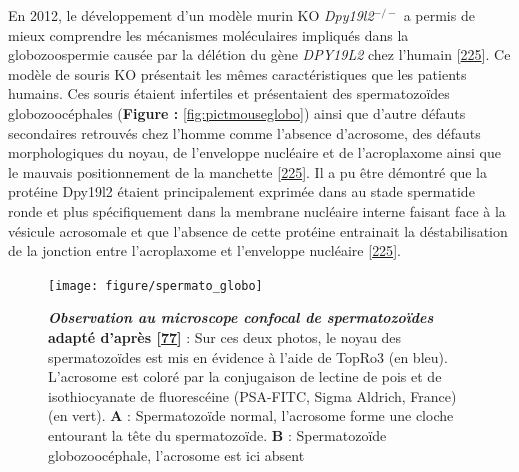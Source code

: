 \documentclass[12pt,a4paper,twoside]{ugathesis}
\theoremstyle{definition}
\theoremstyle{definition}
\theoremstyle{definition}
\theoremstyle{remark}
\begin{document}
En 2012, le développement d'un modèle murin KO \emph{Dpy19l2}\(^{-/-}\)
a permis de mieux comprendre les mécanismes moléculaires impliqués dans
la globozoospermie causée par la délétion du gène \emph{DPY19L2} chez
l'humain {[}\protect\hyperlink{ref-Pierre2012}{225}{]}. Ce modèle de
souris KO présentait les mêmes caractéristiques que les patients
humains. Ces souris étaient infertiles et présentaient des
spermatozoïdes globozoocéphales (\textbf{Figure :
}\ref{fig:pictmouseglobo}) ainsi que d'autre défauts secondaires
retrouvés chez l'homme comme l'absence d'acrosome, des défauts
morphologiques du noyau, de l'enveloppe nucléaire et de l'acroplaxome
ainsi que le mauvais positionnement de la manchette
{[}\protect\hyperlink{ref-Pierre2012}{225}{]}. Il a pu être démontré que
la protéine Dpy19l2 étaient principalement exprimée dans au stade
spermatide ronde et plus spécifiquement dans la membrane nucléaire
interne faisant face à la vésicule acrosomale et que l'absence de cette
protéine entrainait la déstabilisation de la jonction entre
l'acroplaxome et l'enveloppe nucléaire
{[}\protect\hyperlink{ref-Pierre2012}{225}{]}.

\newpage

\begin{figure}

{\centering \texttt{[image: figure/spermato\_globo]} 

}

\caption[Observation au microscope confocal de spermatozoïdes]{\textbf{\emph{Observation au microscope confocal de
spermatozoïdes} adapté d'après
{[}\protect\hyperlink{ref-Harbuz2011}{77}{]}} : Sur ces deux photos, le
noyau des spermatozoïdes est mis en évidence à l'aide de TopRo3 (en
bleu). L'acrosome est coloré par la conjugaison de lectine de pois et de
isothiocyanate de fluorescéine (PSA-FITC, Sigma Aldrich, France) (en
vert). \textbf{A} : Spermatozoïde normal, l'acrosome forme une cloche
entourant la tête du spermatozoïde. \textbf{B} : Spermatozoïde
globozoocéphale, l'acrosome est ici absent}\label{fig:pictglobospz}
\end{figure}
\end{document}

